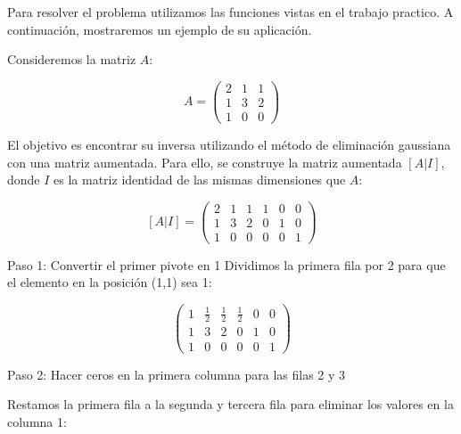Para resolver el problema utilizamos las funciones vistas en el trabajo practico. A continuación, mostraremos un ejemplo de su aplicación.

Consideremos la matriz \( A \):

\[
A = \begin{pmatrix}
2 & 1 & 1 \\
1 & 3 & 2 \\
1 & 0 & 0
\end{pmatrix}
\]

El objetivo es encontrar su inversa utilizando el método de eliminación gaussiana con una matriz aumentada. Para ello, se construye la matriz aumentada \( [A | I] \), donde \( I \) es la matriz identidad de las mismas dimensiones que \( A \):

\[
[A | I] = \begin{pmatrix}
2 & 1 & 1 & 1 & 0 & 0 \\
1 & 3 & 2 & 0 & 1 & 0 \\
1 & 0 & 0 & 0 & 0 & 1
\end{pmatrix}
\]

Paso 1: Convertir el primer pivote en 1
Dividimos la primera fila por 2 para que el elemento en la posición (1,1) sea 1:

\[
\begin{pmatrix}
1 & \frac{1}{2} & \frac{1}{2} & \frac{1}{2} & 0 & 0 \\
1 & 3 & 2 & 0 & 1 & 0 \\
1 & 0 & 0 & 0 & 0 & 1
\end{pmatrix}
\]

Paso 2: Hacer ceros en la primera columna para las filas 2 y 3

Restamos la primera fila a la segunda y tercera fila para eliminar los valores en la columna 1:

